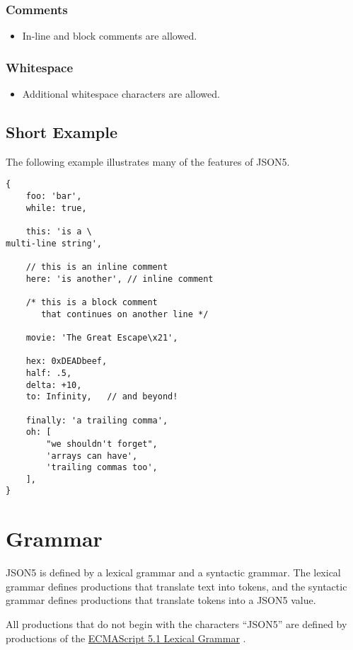 \documentclass{article}
\newcommand{\esref}[2]{\href{http://www.ecma-international.org/ecma-262/5.1/\#sec-#2}{#1}}
\begin{document}
\subsubsection*{Comments}

\begin{itemize}
	\item In-line and block comments are allowed.
\end{itemize}

\subsubsection*{Whitespace}

\begin{itemize}
	\item Additional whitespace characters are allowed.
\end{itemize}

\subsection{Short Example}

The following example illustrates many of the features of JSON5.

\begin{verbatim}
{
	foo: 'bar',
	while: true,

	this: 'is a \
multi-line string',

	// this is an inline comment
	here: 'is another', // inline comment

	/* this is a block comment
	   that continues on another line */

	movie: 'The Great Escape\x21',

	hex: 0xDEADbeef,
	half: .5,
	delta: +10,
	to: Infinity,   // and beyond!

	finally: 'a trailing comma',
	oh: [
		"we shouldn't forget",
		'arrays can have',
		'trailing commas too',
	],
}
\end{verbatim}

\section{Grammar}

JSON5 is defined by a lexical grammar and a syntactic grammar. The lexical
grammar defines productions that translate text into tokens, and the syntactic
grammar defines productions that translate tokens into a JSON5 value.

All productions that do not begin with the characters ``JSON5'' are defined by
productions of the \esref{ECMAScript 5.1 Lexical Grammar}{5.1.2} \cite{es5}.
\end{document}
